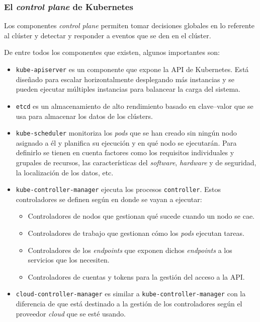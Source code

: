 \subsubsection*{El \textit{control plane} de Kubernetes}
Los componentes \textit{control plane} permiten tomar decisiones globales en
lo referente al clúster y detectar y responder a eventos que se den en el
clúster.

De entre todos los componentes que existen, algunos importantes son:

\begin{itemize}
    \item \texttt{kube-apiserver} es un componente que expone la API de
          Kubernetes. Está diseñado para escalar horizontalmente desplegando
          más instancias y se pueden ejecutar múltiples instancias para balancear
          la carga del sistema.
    \item \texttt{etcd} es un almacenamiento de alto rendimiento basado en
          clave--valor que se usa para almacenar los datos de los clústers.
    \item \texttt{kube-scheduler} monitoriza los \textit{pods} que se han creado
          sin ningún nodo asignado a él y planifica su ejecución y en qué nodo
          se ejecutarán. Para definirlo se tienen en cuenta factores como los
          requisitos individuales y grupales de recursos, las características
          del \textit{software}, \textit{hardware} y de seguridad, la localización
          de los datos, etc.
    \item \texttt{kube-controller-manager} ejecuta los procesos \texttt{controller}.
          Estos controladores se definen según en donde se vayan a ejecutar:
          \begin{itemize}
              \item Controladores de nodos que gestionan qué sucede cuando un nodo
                    se cae.
              \item Controladores de trabajo que gestionan cómo los \textit{pods}
                    ejecutan tareas.
              \item Controladores de los \textit{endpoints} que exponen dichos
                    \textit{endpoints} a los servicios que los necesiten.
              \item Controladores de cuentas y tokens para la gestión del acceso
                    a la API.
          \end{itemize}
    \item \texttt{cloud-controller-manager} es similar a \texttt{kube-controller-manager}
          con la diferencia de que está destinado a la gestión de los controladores
          según el proveedor \textit{cloud} que se esté usando.
\end{itemize}

